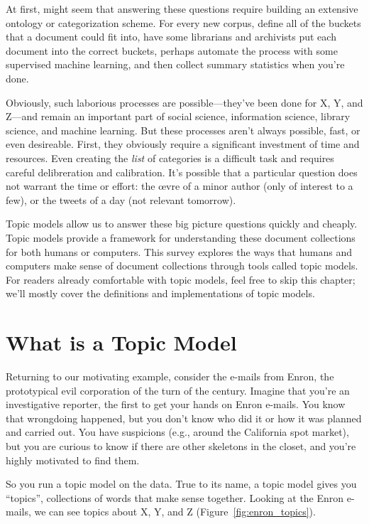 At first, might seem that answering these questions require building an
extensive ontology or categorization scheme.  For every new corpus, define all
of the buckets that a document could fit into, have some librarians and
archivists put each document into the correct buckets, perhaps automate the
process with some supervised machine learning, and then collect summary
statistics when you're done.

Obviously, such laborious processes are possible---they've been done for X, Y,
and Z---and remain an important part of social science, information science,
library science, and machine learning.  But these processes aren't always
possible, fast, or even desireable.  First, they obviously require a significant
investment of time and resources.  Even creating the \emph{list} of categories
is a difficult task and requires careful delibreration and calibration.  It's
possible that a particular question does not warrant the time or effort: the
\oe{}vre of a minor author (only of interest to a few), or the tweets of a day
(not relevant tomorrow).

Topic models allow us to answer these big picture questions quickly and cheaply.
Topic models provide a framework for understanding these document collections
for both humans or computers.  This survey explores the ways that humans and
computers make sense of document collections through tools called topic models.
For readers already comfortable with topic models, feel free to skip this
chapter; we'll mostly cover the definitions and implementations of topic models.

\section{What is a Topic Model}

Returning to our motivating example, consider the e-mails from Enron, the prototypical
evil corporation of the turn of the century.  Imagine that you're an
investigative reporter, the first to get your hands on Enron e-mails.  You know
that wrongdoing happened, but you don't know who did it or how it was planned
and carried out.  You have suspicions (e.g., around the California spot market),
but you are curious to know if there are other skeletons in the closet, and
you're highly motivated to find them.

So you run a topic model on the data.  True to its name, a topic model gives you
``topics'', collections of words that make sense together.  Looking at the Enron
e-mails, we can see topics about X, Y, and Z (Figure~\ref{fig:enron_topics}).


